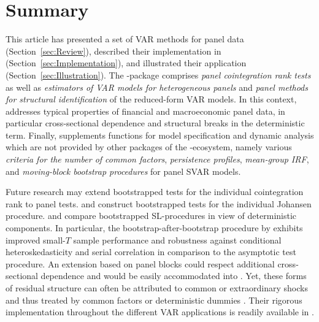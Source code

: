 
\section{Summary} \label{sec:Summary}
This article has presented a set of VAR methods for panel data (Section~\ref{sec:Review}), described their implementation in  (Section~\ref{sec:Implementation}), and illustrated their application (Section~\ref{sec:Illustration}). The -package comprises \textit{panel cointegration rank tests} as well as \textit{estimators of VAR models for heterogeneous panels} and \textit{panel methods for structural identification} of the reduced-form VAR models. In this context,  addresses typical properties of financial and macroeconomic panel data, in particular cross-sectional dependence and structural breaks in the deterministic term. Finally,  supplements functions for model specification and dynamic analysis which are not provided by other packages of the -ecosystem, namely various \textit{criteria for the number of common factors}, \textit{persistence profiles}, \textit{mean-group IRF}, and \textit{moving-block bootstrap procedures} for panel SVAR models.


Future research may extend bootstrapped tests for the individual cointegration rank to  panel tests. \citet{Swensen2006,Swensen2009} and \citet{CavaliereEtAl2012,CavaliereEtAl2014} construct bootstrapped tests for the individual Johansen procedure. \citet{Trenkler2009} and \cite{CavaliereEtAl2013} compare bootstrapped SL-procedures in view of deterministic components. In particular, the bootstrap-after-bootstrap procedure by \citet{CavaliereEtAl2015} exhibits improved small-$T$ sample performance and robustness against conditional heteroskedasticity and serial correlation in comparison to the asymptotic test procedure. An extension based on panel blocks could respect additional cross-sectional dependence and would be easily accommodated into . Yet, these forms of residual structure can often be attributed to common or extraordinary shocks and thus treated by common factors or deterministic dummies \citep[Ch.~6.7]{Juselius2007}. Their rigorous implementation throughout the different VAR applications is readily available in .


